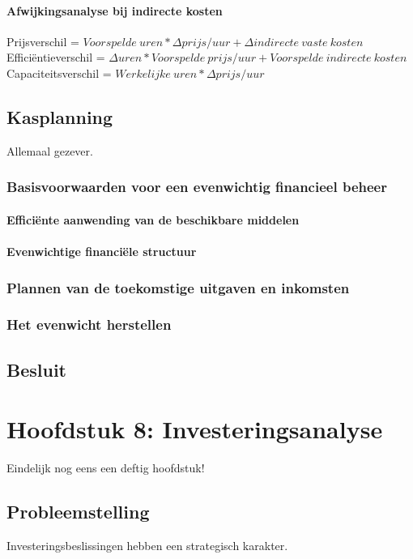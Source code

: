 \documentclass[12pt]{article}
\begin{document}
\paragraph{Afwijkingsanalyse bij indirecte kosten}
\begin{center}
Prijsverschil = $Voorspelde\ uren * \Delta prijs/uur + \Delta indirecte\ vaste\ kosten$\\
Effici\"entieverschil = $\Delta uren * Voorspelde\ prijs/uur + Voorspelde\ indirecte\ kosten$\\
Capaciteitsverschil = $Werkelijke\ uren * \Delta prijs/uur$
\end{center}
\subsection{Kasplanning}
Allemaal gezever.
\subsubsection{Basisvoorwaarden voor een evenwichtig financieel beheer}
\paragraph{Effici\"ente aanwending van de beschikbare middelen}
\paragraph{Evenwichtige financi\"ele structuur}
\subsubsection{Plannen van de toekomstige uitgaven en inkomsten}
\subsubsection{Het evenwicht herstellen}
\subsection{Besluit}
\clearpage
\section{Hoofdstuk 8: Investeringsanalyse}
Eindelijk nog eens een deftig hoofdstuk!
\subsection{Probleemstelling}
Investeringsbeslissingen hebben een strategisch karakter.
\end{document}
